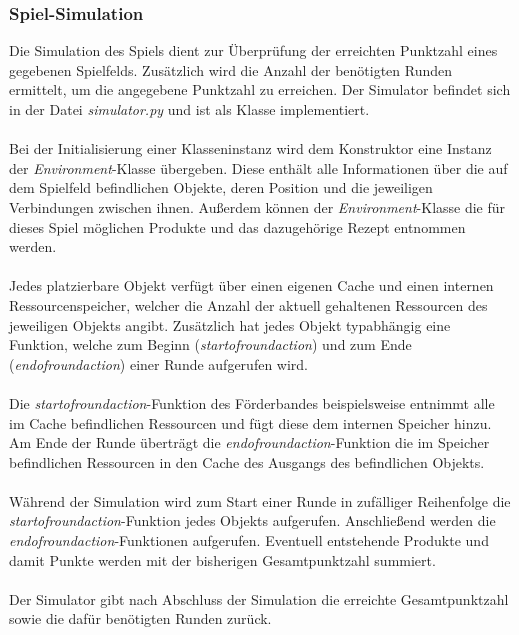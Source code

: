 \subsubsection*{Spiel-Simulation}
Die Simulation des Spiels dient zur Überprüfung der erreichten Punktzahl eines gegebenen Spielfelds. Zusätzlich wird die Anzahl der benötigten Runden ermittelt, um die angegebene Punktzahl zu erreichen. Der Simulator befindet sich in der Datei \textit{simulator.py} und ist als Klasse implementiert.
\\\\
Bei der Initialisierung einer Klasseninstanz wird dem Konstruktor eine Instanz der \textit{Environment}-Klasse übergeben. Diese enthält alle Informationen über die auf dem Spielfeld befindlichen Objekte, deren Position und die jeweiligen Verbindungen zwischen ihnen. Außerdem können der \textit{Environment}-Klasse die für dieses Spiel möglichen Produkte und das dazugehörige Rezept entnommen werden.
\\\\
Jedes platzierbare Objekt verfügt über einen eigenen Cache und einen internen Ressourcenspeicher, welcher die Anzahl der aktuell gehaltenen Ressourcen des jeweiligen Objekts angibt. Zusätzlich hat jedes Objekt typabhängig eine Funktion, welche zum Beginn (\textit{start\textunderscore{}of\textunderscore{}round\textunderscore{}action}) und zum Ende (\textit{end\textunderscore{}of\textunderscore{}round\textunderscore{}action}) einer Runde aufgerufen wird.
\\\\
Die \textit{start\textunderscore{}of\textunderscore{}round\textunderscore{}action}-Funktion des Förderbandes beispielsweise entnimmt alle im Cache befindlichen Ressourcen und fügt diese dem internen Speicher hinzu. Am Ende der Runde überträgt die  \textit{end\textunderscore{}of\textunderscore{}round\textunderscore{}action}-Funktion die im Speicher befindlichen Ressourcen in den Cache des Ausgangs des befindlichen Objekts.
\\\\
Während der Simulation wird zum Start einer Runde in zufälliger Reihenfolge die \textit{start\textunderscore{}of\textunderscore{}round\textunderscore{}action}-Funktion jedes Objekts aufgerufen. Anschließend werden die \textit{end\textunderscore{}of\textunderscore{}round\textunderscore{}action}-Funktionen aufgerufen. Eventuell entstehende Produkte und damit Punkte werden mit der bisherigen Gesamtpunktzahl summiert.
\\\\
Der Simulator gibt nach Abschluss der Simulation die erreichte Gesamtpunktzahl sowie die dafür benötigten Runden zurück.

